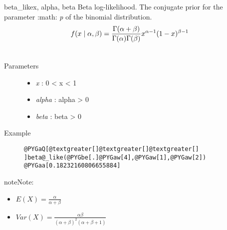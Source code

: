 \hypertarget{pymc.distributions.beta_like}{}\begin{funcdesc}{beta\_like}{x, alpha, beta}
Beta log-likelihood. The conjugate prior for the parameter :math: \emph{p} of the binomial distribution.
\begin{gather}
\begin{split}f(x \mid \alpha, \beta) = \frac{\Gamma(\alpha + \beta)}{\Gamma(\alpha) \Gamma(\beta)} x^{\alpha - 1} (1 - x)^{\beta - 1}\end{split}\notag\\\begin{split}\end{split}\notag
\end{gather}\begin{description}
\item[Parameters] \leavevmode\begin{itemize}
\item {}
\emph{x} : 0 \textless{} x \textless{} 1

\item {}
\emph{alpha} : alpha \textgreater{} 0

\item {}
\emph{beta} : beta \textgreater{} 0

\end{itemize}

\item[Example] \leavevmode
\begin{Verbatim}[commandchars=@\[\]]
@PYGaQ[@textgreater[]@textgreater[]@textgreater[] ]beta@_like(@PYGbe[.]@PYGaw[4],@PYGaw[1],@PYGaw[2])
@PYGaa[0.18232160806655884]
\end{Verbatim}

\end{description}

\begin{notice}{note}{Note:}\begin{itemize}
\item {}
$E(X)=\frac{\alpha}{\alpha+\beta}$

\item {}
$Var(X)=\frac{\alpha \beta}{(\alpha+\beta)^2(\alpha+\beta+1)}$

\end{itemize}
\end{notice}
\end{funcdesc}

